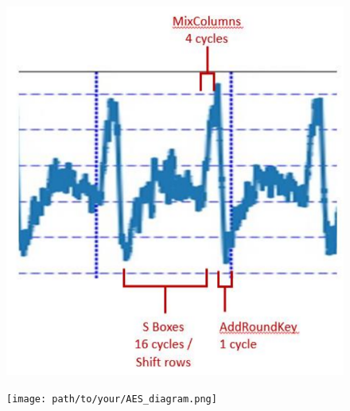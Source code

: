 \begin{frame}
    \begin{figure}
        \centering
        \begin{minipage}{0.48\textwidth}
            \centering
            \includegraphics[width=\linewidth]{main thing/Pictures/detailed_AES_SPA_trace.png}
        \end{minipage}\hfill
        \begin{minipage}{0.48\textwidth}
            \centering
            \texttt{[image: path/to/your/AES\_diagram.png]}
        \end{minipage}
    \end{figure}
\end{frame}


